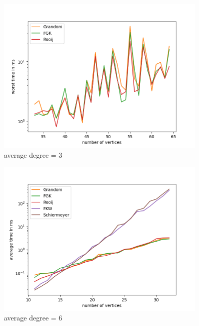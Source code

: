 \begin{figure}[H]
    \centering
    \includegraphics[width=0.9\textwidth]{figures/l3_worst.png}
    \caption{average degree = 3}
    \label{fig:l3_worst}
\end{figure}

\begin{figure}[H]
    \centering
    \includegraphics[width=0.9\textwidth]{figures/m6_average.png}
    \caption{average degree = 6}
    \label{fig:m6_average}
\end{figure}


